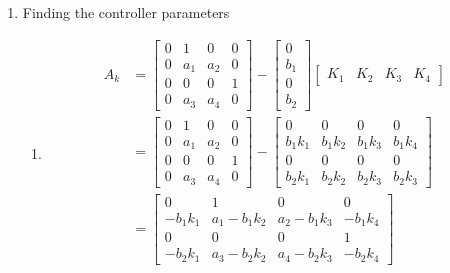 \documentclass[11pt, twoside, letterpaper]{article}   	%
\begin{document}
\begin{enumerate}
\item Finding the controller parameters
\begin{enumerate}
\item
\begin{align*}
A_k &= 
\begin{bmatrix}
0 &1 &0 &0\\
0 &a_1 &a_2 &0\\
0 &0 &0 &1\\
0 &a_3 &a_4 &0
\end{bmatrix}
- 
\begin{bmatrix}
0\\ b_1\\ 0 \\ b_2
\end{bmatrix}
\begin{bmatrix}
K_1 & K_2 &K_3 & K_4
\end{bmatrix}\\
&=
\begin{bmatrix}
0 &1 &0 &0\\
0 &a_1 &a_2 &0\\
0 &0 &0 &1\\
0 &a_3 &a_4 &0
\end{bmatrix}
-
\begin{bmatrix}
0 &0 &0 &0\\
b_1k_1 &b_1k_2 &b_1k_3 &b_1k_4\\
0 &0 &0 &0\\
b_2k_1 &b_2k_2 &b_2k_3 &b_2k_3
\end{bmatrix}\\
&=
\begin{bmatrix}
0 &1 &0 &0\\
-b_1k_1 &a_1-b_1k_2 &a_2-b_1k_3 &-b_1k_4\\
0 &0 &0 &1\\
-b_2k_1 &a_3-b_2k_2 &a_4-b_2k_3 &-b_2k_4
\end{bmatrix}\\
\end{align*}


\end{enumerate}
\end{enumerate}
\end{document}
